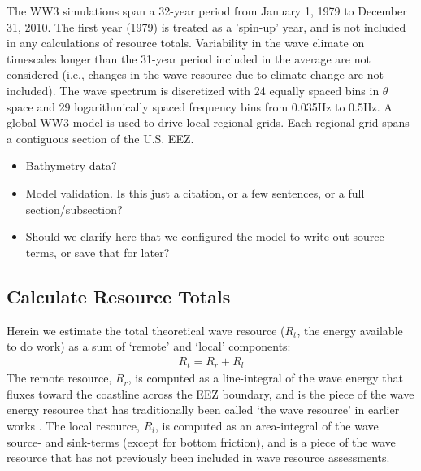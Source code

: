 The WW3 simulations span a 32-year period from January 1, 1979 to December 31, 2010. The first year (1979) is treated as a 'spin-up' year, and is not included in any calculations of resource totals. Variability in the wave climate on timescales longer than the 31-year period included in the average are not considered (i.e., changes in the wave resource due to climate change are not included).
The wave spectrum is discretized with 24 equally spaced bins in $\theta$ space and 29 logarithmically spaced frequency bins from 0.035Hz to 0.5Hz. A global WW3 model is used to drive local regional grids. Each regional grid spans a contiguous section of the U.S. EEZ.

\begin{itemize}
\item Bathymetry data?
\item Model validation. Is this just a citation, or a few sentences, or a full section/subsection?
\item Should we clarify here that we configured the model to write-out source terms, or save that for later?
\end{itemize}

\subsection{Calculate Resource Totals} \label{sec:method:calc}

Herein we estimate the total theoretical wave resource ($R_t$, the energy available to do work) as a sum of `remote' and `local' components:
\begin{align}
  R_t = R_r + R_l
\end{align}
The remote resource, $R_r$, is computed as a line-integral of the wave energy that fluxes toward the coastline across the EEZ boundary, and is the piece of the wave energy resource that has traditionally been called `the wave resource' in earlier works \citep{gunnQuantifyingGlobalWave2012,EPRIwaveresource2011}. The local resource, $R_l$, is computed as an area-integral of the wave source- and sink-terms (except for bottom friction), and is a piece of the wave resource that has not previously been included in wave resource assessments.

